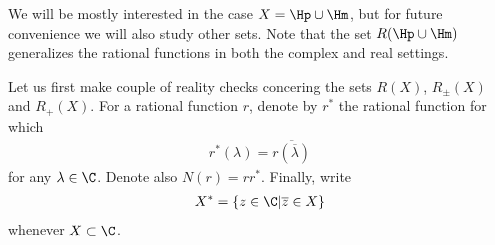 We will be mostly interested in the case $X = \Hp \cup \Hm$, but for future convenience we will also study other sets. Note that the set $R(\Hp \cup \Hm)$ generalizes the rational functions in both the complex and real settings.

Let us first make couple of reality checks concering the sets $R(X)$, $R_{\pm}(X)$ and $R_{+}(X)$. For a rational function $r$, denote by $r^{*}$ the rational function for which
\begin{align*}
	r^{*}(\lambda) = \overline{r(\overline{\lambda})}
\end{align*}
for any $\lambda \in \C$. Denote also $N(r) = r r^{*}$. Finally, write
\begin{align*}
	X^{*} = \{z \in \C | \overline{z} \in X \}
\end{align*}
whenever $X \subset \C$.

